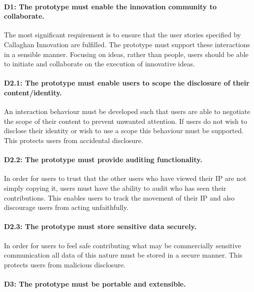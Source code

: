 \paragraph{D1: The prototype must enable the innovation community to collaborate.}

The most significant requirement is to ensure that the user stories specified by Callaghan Innovation are fulfilled. The prototype must support these interactions in a sensible manner. Focusing on ideas, rather than people, users should be able to initiate and collaborate on the execution of innovative ideas.

\paragraph{D2.1:  The prototype must enable users to scope the disclosure of their content/identity.}

An interaction behaviour must be developed such that users are able to negotiate the scope of their content to prevent unwanted attention. If users do not wish to disclose their identity or wish to use a scope this behaviour must be supported. This protects users from accidental disclosure.

\paragraph{D2.2: The prototype must provide auditing functionality.}

In order for users to trust that the other users who have viewed their IP are not simply copying it, users must have the ability to audit who has seen their contributions. This enables users to track the movement of their IP and also discourage users from acting unfaithfully.

\paragraph{D2.3: The prototype must store sensitive data securely.}

In order for users to feel safe contributing what may be commercially sensitive communication all data of this nature must be stored in a secure manner. This protects users from malicious disclosure.

\paragraph{D3:  The prototype must be portable and extensible.}

